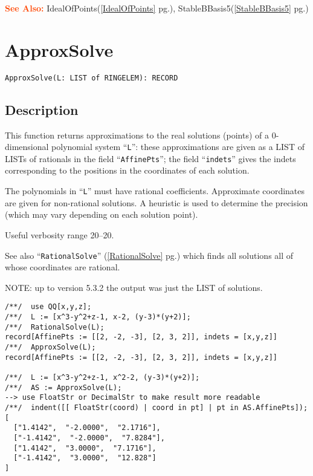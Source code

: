 \documentclass[a4paper]{mybook}
\newenvironment{command}{}{} %
\newcommand\SeeAlso{\par\textcolor{OrangeRed}{\textbf{\large See Also: }}}
\begin{document}
\begin{command}
\SeeAlso %
  IdealOfPoints(\ref{IdealOfPoints} pg.\pageref{IdealOfPoints}), 
    StableBBasis5(\ref{StableBBasis5} pg.\pageref{StableBBasis5})
\end{command} %

\section{ApproxSolve}
\label{ApproxSolve}
\begin{command} %


\begin{Verbatim}[label=syntax, rulecolor=\color{MidnightBlue},
frame=single]
ApproxSolve(L: LIST of RINGELEM): RECORD
\end{Verbatim}


\subsection*{Description}

This function returns approximations to the real solutions (points) of a
0-dimensional polynomial system ``\verb&L&'': these approximations are
given as a LIST of LISTs of rationals in the field ``\verb&AffinePts&'';
the field ``\verb&indets&'' gives the indets corresponding to the positions
in the coordinates of each solution.
\par 
The polynomials in ``\verb&L&'' must have rational coefficients.
Approximate coordinates are given for non-rational solutions.
A heuristic is used to determine the precision (which may vary
depending on each solution point).
\par 
Useful verbosity range 20--20.
\par 
See also ``\verb&RationalSolve&'' (\ref{RationalSolve} pg.\pageref{RationalSolve}) which finds all solutions all of whose
coordinates are rational.
\par 
NOTE: up to version 5.3.2 the output was just the LIST of solutions.
\begin{Verbatim}[label=example, rulecolor=\color{PineGreen}, frame=single]
/**/  use QQ[x,y,z];
/**/  L := [x^3-y^2+z-1, x-2, (y-3)*(y+2)];
/**/  RationalSolve(L);
record[AffinePts := [[2, -2, -3], [2, 3, 2]], indets = [x,y,z]]
/**/  ApproxSolve(L);
record[AffinePts := [[2, -2, -3], [2, 3, 2]], indets = [x,y,z]]

/**/  L := [x^3-y^2+z-1, x^2-2, (y-3)*(y+2)];
/**/  AS := ApproxSolve(L);
--> use FloatStr or DecimalStr to make result more readable
/**/  indent([[ FloatStr(coord) | coord in pt] | pt in AS.AffinePts]);
[
  ["1.4142",  "-2.0000",  "2.1716"],
  ["-1.4142",  "-2.0000",  "7.8284"],
  ["1.4142",  "3.0000",  "7.1716"],
  ["-1.4142",  "3.0000",  "12.828"]
]


\end{Verbatim}
\end{command}
\end{document}
